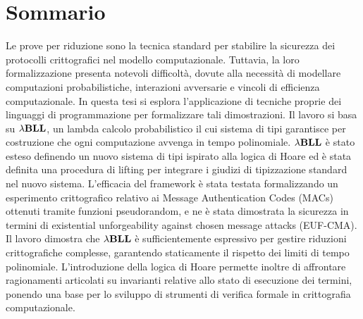\chapter*{Sommario}

Le prove per riduzione sono la tecnica standard per stabilire la sicurezza dei protocolli crittografici nel modello computazionale. Tuttavia, la loro formalizzazione presenta notevoli difficoltà, dovute alla necessità di modellare computazioni probabilistiche, interazioni avversarie e vincoli di efficienza computazionale. In questa tesi si esplora l'applicazione di tecniche proprie dei linguaggi di programmazione per formalizzare tali dimostrazioni. Il lavoro si basa su ${\lambda}\mathbf{BLL}$, un lambda calcolo probabilistico il cui sistema di tipi garantisce per costruzione che ogni computazione avvenga in tempo polinomiale. ${\lambda}\mathbf{BLL}$ è stato esteso definendo un nuovo sistema di tipi ispirato alla logica di Hoare ed è stata definita una procedura di lifting per integrare i giudizi di tipizzazione standard nel nuovo sistema. L'efficacia del framework è stata testata formalizzando un esperimento crittografico relativo ai Message Authentication Codes (MACs) ottenuti tramite funzioni pseudorandom, e ne è stata dimostrata la sicurezza in termini di existential unforgeability against chosen message attacks (EUF-CMA). Il lavoro dimostra che ${\lambda}\mathbf{BLL}$ è sufficientemente espressivo per gestire riduzioni crittografiche complesse, garantendo staticamente il rispetto dei limiti di tempo polinomiale. L'introduzione della logica di Hoare permette inoltre di affrontare ragionamenti articolati su invarianti relative allo stato di esecuzione dei termini, ponendo una base per lo sviluppo di strumenti di verifica formale in crittografia computazionale.

\clearpage{\pagestyle{empty}\cleardoublepage}
